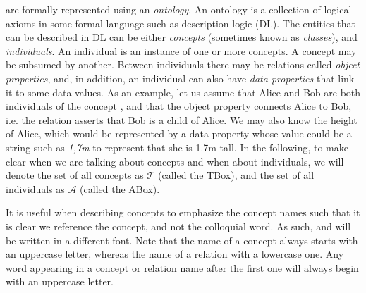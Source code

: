 \neems are formally represented using an \emph{ontology}.
An ontology is a collection of logical axioms in some formal language such as description logic (DL).
The entities that can be described in DL can be either \emph{concepts} (sometimes known as \emph{classes}),
and  \emph{individuals}.
An individual is an instance of one or more concepts.
A concept may be subsumed by another.
Between individuals there may be relations called \emph{object properties},
and, in addition, an individual can also have \emph{data properties} that link it to some data values.
As an example, let us assume that Alice and Bob are both individuals of the concept ,
and that the object property  connects Alice to Bob,
i.e. the relation asserts that Bob is a child of Alice.
We may also know the height of Alice, which would be represented by a data property  whose value could be a string such as \emph{1,7m} to represent that she is 1.7m tall.
In the following, to make clear when we are talking about concepts and when about individuals, we will denote the set of all concepts as $\mathcal{T}$ (called the TBox), and the set of all individuals as $\mathcal{A}$ (called the ABox).

It is useful when describing concepts to emphasize the concept names such that it is clear we reference the concept, and not the colloquial word. As such,  and  will be written in a different font. Note that the name of a concept always starts with an uppercase letter, whereas the name of a relation with a lowercase one. Any word appearing in a concept or relation name after the first one will always begin with an uppercase letter.

